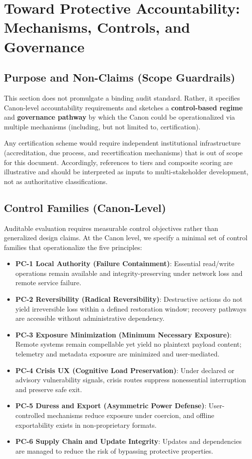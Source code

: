 \documentclass[12pt]{article}
\begin{document}
\section{Toward Protective Accountability: Mechanisms, Controls, and Governance}
\label{sec:protective-audit}

\subsection{Purpose and Non-Claims (Scope Guardrails)}
This section does not promulgate a binding audit standard. Rather, it specifies Canon-level accountability requirements and sketches a \textbf{control-based regime} and \textbf{governance pathway} by which the Canon could be operationalized via multiple mechanisms (including, but not limited to, certification).

Any certification scheme would require independent institutional infrastructure (accreditation, due process, and recertification mechanisms) that is out of scope for this document. Accordingly, references to tiers and composite scoring are illustrative and should be interpreted as inputs to multi-stakeholder development, not as authoritative classifications.

\subsection{Control Families (Canon-Level)}
Auditable evaluation requires measurable control objectives rather than generalized design claims. At the Canon level, we specify a minimal set of control families that operationalize the five principles:

\begin{itemize}
\item \textbf{PC-1 Local Authority (Failure Containment)}: Essential read/write operations remain available and integrity-preserving under network loss and remote service failure.
\item \textbf{PC-2 Reversibility (Radical Reversibility)}: Destructive actions do not yield irreversible loss within a defined restoration window; recovery pathways are accessible without administrative dependency.
\item \textbf{PC-3 Exposure Minimization (Minimum Necessary Exposure)}: Remote systems remain compellable yet yield no plaintext payload content; telemetry and metadata exposure are minimized and user-mediated.
\item \textbf{PC-4 Crisis UX (Cognitive Load Preservation)}: Under declared or advisory vulnerability signals, crisis routes suppress nonessential interruption and preserve safe exit.
\item \textbf{PC-5 Duress and Export (Asymmetric Power Defense)}: User-controlled mechanisms reduce exposure under coercion, and offline exportability exists in non-proprietary formats.
\item \textbf{PC-6 Supply Chain and Update Integrity}: Updates and dependencies are managed to reduce the risk of bypassing protective properties.
\end{itemize}
\end{document}
